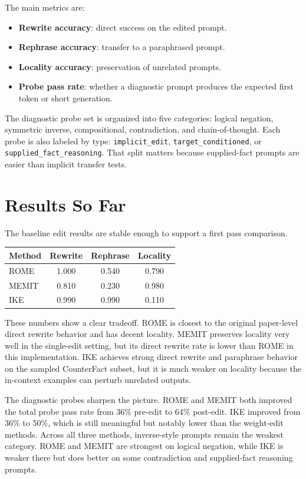 \documentclass[11pt]{article}
\begin{document}
The main metrics are:
\begin{itemize}[leftmargin=*]
  \item \textbf{Rewrite accuracy}: direct success on the edited prompt.
  \item \textbf{Rephrase accuracy}: transfer to a paraphrased prompt.
  \item \textbf{Locality accuracy}: preservation of unrelated prompts.
  \item \textbf{Probe pass rate}: whether a diagnostic prompt produces the expected first token or short generation.
\end{itemize}

The diagnostic probe set is organized into five categories: logical negation, symmetric inverse, compositional, contradiction, and chain-of-thought.
Each probe is also labeled by type:
\texttt{implicit\_edit}, \texttt{target\_conditioned}, or \texttt{supplied\_fact\_reasoning}.
That split matters because supplied-fact prompts are easier than implicit transfer tests.

\section*{Results So Far}
The baseline edit results are stable enough to support a first pass comparison.

\begin{center}
\begin{tabular}{lccc}
\toprule
Method & Rewrite & Rephrase & Locality \\
\midrule
ROME & 1.000 & 0.540 & 0.790 \\
MEMIT & 0.810 & 0.230 & 0.980 \\
IKE & 0.990 & 0.990 & 0.110 \\
\bottomrule
\end{tabular}
\end{center}

These numbers show a clear tradeoff.
ROME is closest to the original paper-level direct rewrite behavior and has decent locality.
MEMIT preserves locality very well in the single-edit setting, but its direct rewrite rate is lower than ROME in this implementation.
IKE achieves strong direct rewrite and paraphrase behavior on the sampled CounterFact subset, but it is much weaker on locality because the in-context examples can perturb unrelated outputs.

The diagnostic probes sharpen the picture.
ROME and MEMIT both improved the total probe pass rate from 36\% pre-edit to 64\% post-edit.
IKE improved from 36\% to 50\%, which is still meaningful but notably lower than the weight-edit methods.
Across all three methods, inverse-style prompts remain the weakest category.
ROME and MEMIT are strongest on logical negation, while IKE is weaker there but does better on some contradiction and supplied-fact reasoning prompts.
\end{document}
